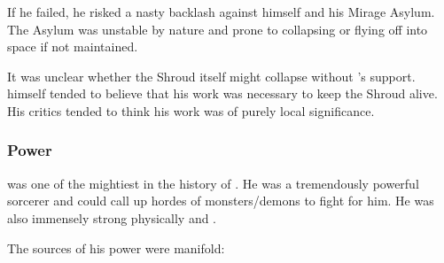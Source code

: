 If he failed, he risked a nasty backlash against himself and his Mirage Asylum. 
The Asylum was unstable by nature and prone to collapsing or flying off into space if not maintained. 

It was unclear whether the Shroud itself might collapse without \Ishnaruchaefir's support. 
\Ishnaruchaefir himself tended to believe that his work was necessary to keep the Shroud alive.
His critics tended to think his work was of purely local significance. 







\subsubsection{Power}
\Ishnaruchaefir was one of the mightiest \dragons in the history of \Miith. 
He was a tremendously powerful sorcerer and could call up hordes of monsters/demons to fight for him. 
He was also immensely strong physically and . 

The sources of his power were manifold:


